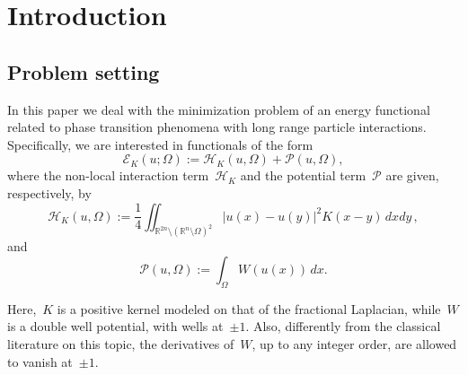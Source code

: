 \documentclass[10pt,a4paper]{amsart}
\numberwithin{equation}{section}
\newcommand{\Rn}{\mathbb{R}^n}
\newcommand{\R}{\mathbb{R}}
\newcommand{\snr}[1]{\lvert #1\rvert}
\newcommand{\Ec}{\mathcal{E}_K}
\newcommand{\Hc}{\mathcal{H}_K}
\newcommand{\Pc}{\mathcal{P}}
\begin{document}
\begin{abstract}
	We investigate existence, uniqueness and asymptotic behavior of minimizers of a family of non-local energy functionals of the type
	\[
	\frac{1}{4}\iint_{\R^{2n}\setminus (\Rn \setminus \Omega)^2}\snr{u(x)-u(y)}^2 {K}(x-y) \,dx dy + \int_\Omega W(u(x)) \,dx.
	\]
Here,~$W$ is a possibly~\textit{degenerate} double well potential with a polynomial control on its second derivative near the wells. Also,~${K}$ belongs to a wide class of measurable kernels and is modeled on that of the fractional Laplacian.
\end{abstract}

\maketitle

\setcounter{equation}{0}\setcounter{theorem}{0}


\setcounter{tocdepth}{1} 
\begin{center}
	\begin{minipage}{11cm}
\footnotesize
		\tableofcontents
	\end{minipage}
\end{center}


\section{Introduction}
\subsection{Problem setting}
In this paper we deal with  the minimization problem of an energy functional related to phase transition phenomena
with long range particle interactions. Specifically, we are interested in functionals of the form
\begin{equation}\label{main_fun}
  \Ec(u;\Omega) := \Hc(u,\Omega)+\Pc(u,\Omega),
\end{equation}
where the non-local interaction term~$\Hc$ and the potential term~$\Pc$ are given, respectively, by
\begin{equation*}
\Hc(u,\Omega):=  \frac{1}{4}\iint_{\R^{2n}\setminus (\Rn \setminus \Omega)^2}\snr{u(x)-u(y)}^2 {K}(x-y) \, dx dy\,,
\end{equation*}
and
\begin{equation}\label{pot_term}
\Pc(u,\Omega) := \int_\Omega W(u(x)) \,dx.
\end{equation}

Here,~$K$ is a positive kernel modeled on that of the fractional Laplacian, while~$W$ is a double well potential, with wells at~$\pm1$. Also, differently from the classical literature on this topic,
the derivatives of~$W$, up to any integer order, are allowed to vanish at~$\pm1$.
\end{document}
